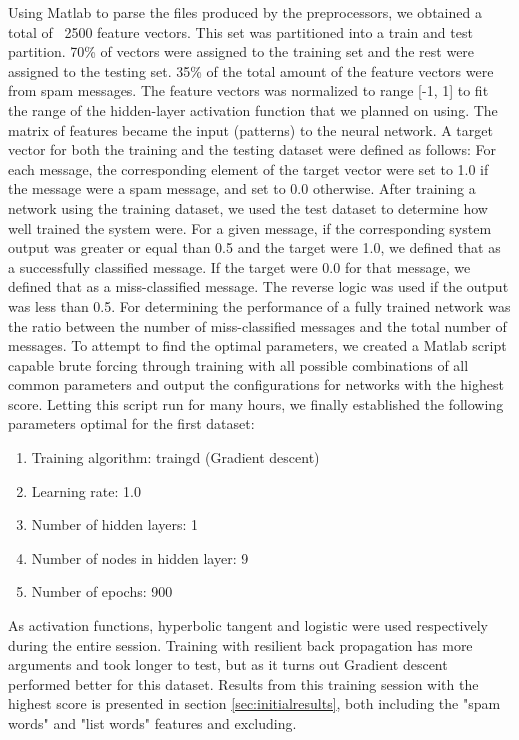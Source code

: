     Using Matlab to parse the files produced by the preprocessors, we obtained
    a total of ~2500 feature vectors. This set was partitioned into a train and
    test partition. 70\% of vectors were assigned to the training set and the
    rest were assigned to the testing set. 35\% of the total amount of the
    feature vectors were from spam messages. The feature vectors was
    normalized to range [-1, 1] to fit the range of the hidden-layer
    activation function that we planned on using. The matrix of features became
    the input (patterns) to the neural network. A target vector for both the
    training and the testing dataset were defined as follows: For each message,
    the corresponding element of the target vector were set to 1.0 if the
    message were a spam message, and set to 0.0 otherwise. 
    After training a network using the training dataset, we used the
    test dataset to determine how well trained the system were. 
    For a given message, if the corresponding system output was greater or
    equal than 0.5 and the target were 1.0, we defined that as a successfully
    classified message. If the target were 0.0 for that message, we defined
    that as a miss-classified message. The reverse logic was used if the output
    was less than 0.5.
    For determining the performance of a fully trained network was the ratio
    between the number of miss-classified messages and the total number of
    messages.
    To attempt to find the optimal parameters, we created a Matlab script
    capable brute forcing through training with all possible combinations of
    all common parameters and output the configurations for networks with the
    highest score. Letting this script run for many hours, we finally
    established the following parameters optimal for the first dataset:
    \begin{enumerate}
      \item Training algorithm: traingd (Gradient descent)
      \item Learning rate: 1.0
      \item Number of hidden layers: 1
      \item Number of nodes in hidden layer: 9
      \item Number of epochs: 900
    \end{enumerate}
    As activation functions, hyperbolic tangent and logistic were used
    respectively during the entire session. 
    Training with resilient back propagation has more arguments and took longer
    to test, but as it turns out Gradient descent performed better for this
    dataset. Results from this training session with the highest score is
    presented in section \ref{sec:initialresults}, both including the "spam
    words" and "list words" features and excluding.

